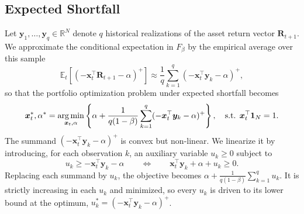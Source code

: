 \subsection{Expected Shortfall} \label{app:lp_es}

Let $\bm{y}_1, \dots, \bm{y}_q \in \mathbb{R}^N$ denote $q$ historical realizations of the asset return vector
$\bm{R}_{t+1}$. We approximate the conditional expectation in $F_\beta$ by the empirical average over this sample
\begin{equation*}
    \mathbb{E}_t[(-\bm{x}_t^\top \bm{R}_{t+1} - \alpha)^+]
    \approx \frac{1}{q} \sum_{k=1}^q (-\bm{x}_t^\top \bm{y}_k - \alpha)^+,
\end{equation*}
so that the portfolio optimization problem under expected shortfall becomes
\begin{equation} \label{eq:empirical_es}
    \bm{x}_t^*, \alpha^* = \operatorname*{arg\,min}_{\bm{x}_t, \alpha} \left\{ \alpha
    + \frac{1}{q(1-\beta)} \sum_{k=1}^q (-\bm{x}_t^\top \bm{y}_k - \alpha)^+ \right\},
    \quad \text{s.t. } \bm{x}_t^\top \bm{1}_N = 1.
\end{equation}
The summand $(-\bm{x}_t^\top \bm{y}_k - \alpha)^+$ is convex but non-linear. We linearize it by introducing, for each
observation $k$, an auxiliary variable $u_k \ge 0$ subject to
\begin{equation} \label{eq:slack_constraint}
    u_k \ge -\bm{x}_t^\top \bm{y}_k - \alpha
    \qquad \Longleftrightarrow \qquad
    \bm{x}_t^\top \bm{y}_k + \alpha + u_k \ge 0.
\end{equation}
Replacing each summand by $u_k$, the objective becomes $\alpha + \frac{1}{q(1-\beta)} \sum_{k=1}^q u_k$. It is
strictly increasing in each $u_k$ and minimized, so every $u_k$ is driven to its lower bound at the optimum,
$u_k^* = (-\bm{x}_t^\top \bm{y}_k - \alpha)^+$. 

